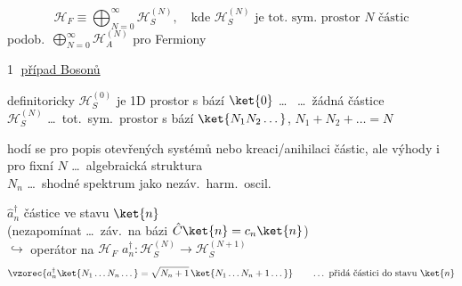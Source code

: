 \begin{definice}
\[
  \mathcal{H}_F \equiv \bigoplus_{N=0}^{\infty}\mathcal{H}_S^{(N)}, \quad\text{kde } \mathcal{H}_S^{(N)} \text{ je tot.\ sym.\ prostor } N \text{ částic}
\]
podob.\ \quad $\bigoplus_{N=0}^{\infty}\mathcal{H}_A^{(N)}$ \quad pro Fermiony
\end{definice}

\textcircled{1} \underline{případ Bosonů}

definitoricky $\mathcal{H}_S^{(0)}$ je 1D prostor s bází $\ket{0}$ \dots\  \dots\ žádná částice \\
\hspace*{2.3cm} $\mathcal{H}_S^{(N)}$ \dots\ tot.\ sym.\ prostor s bází $\ket{N_1N_2\dots}$, \quad $N_1 + N_2 + \dots = N$

hodí se pro popis otevřených systémů nebo kreaci/anihilaci částic, ale výhody i pro fixní $N$ \dots\ algebraická struktura \\
\hspace*{3cm} $N_n$ \dots\ shodné spektrum jako nezáv.\ harm.\ oscil.

\begin{definice}
 $\hat a_n^\dagger$ částice ve stavu $\ket{n}$ \\
\hspace*{3cm} (nezapomínat \dots\ záv.\ na bázi $\hat C\ket{n} = c_n\ket{n}$) \\
$\hookrightarrow$ operátor na $\mathcal{H}_F$ \quad $a_n^\dagger: \mathcal{H}_S^{(N)}\to\mathcal{H}_S^{(N+1)}$
\[
  \vzorec{a_n^\dagger\ket{N_1\dots N_n\dots} = \sqrt{N_n+1}\,\ket{N_1\dots N_n+1\dots}}
  \qquad\dots\ \text{přidá částici do stavu } \ket{n}
\]
\end{definice}

